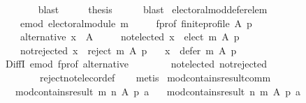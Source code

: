 \begin{isabellebody}
\ \ \ \ \ \ \isamarkupfalse%
\ blast\isanewline
\ \ \isamarkupfalse%
\ \isamarkupfalse%
\ {\isacharquery}{\kern0pt}thesis\isanewline
\ \ \ \ \isamarkupfalse%
\ blast\isanewline
{}\isamarkupfalse%
%
\endisatagproof
{\isafoldproof}%
%
\isadelimproof
\isanewline
%
\endisadelimproof
\isanewline
{}\isamarkupfalse%
\ electoral{\isacharunderscore}{\kern0pt}mod{\isacharunderscore}{\kern0pt}defer{\isacharunderscore}{\kern0pt}elem{\isacharcolon}{\kern0pt}\isanewline
\ \ \isanewline
\ \ \ \ e{\isacharunderscore}{\kern0pt}mod{\isacharcolon}{\kern0pt}\ {\isachardoublequoteopen}electoral{\isacharunderscore}{\kern0pt}module\ m{\isachardoublequoteclose}\ \isanewline
\ \ \ \ f{\isacharunderscore}{\kern0pt}prof{\isacharcolon}{\kern0pt}\ {\isachardoublequoteopen}finite{\isacharunderscore}{\kern0pt}profile\ A\ p{\isachardoublequoteclose}\ \isanewline
\ \ \ \ alternative{\isacharcolon}{\kern0pt}\ {\isachardoublequoteopen}x\ {\isasymin}\ A{\isachardoublequoteclose}\ \isanewline
\ \ \ \ not{\isacharunderscore}{\kern0pt}elected{\isacharcolon}{\kern0pt}\ {\isachardoublequoteopen}x\ {\isasymnotin}\ elect\ m\ A\ p{\isachardoublequoteclose}\ \isanewline
\ \ \ \ not{\isacharunderscore}{\kern0pt}rejected{\isacharcolon}{\kern0pt}\ {\isachardoublequoteopen}x\ {\isasymnotin}\ reject\ m\ A\ p{\isachardoublequoteclose}\isanewline
\ \ \ {\isachardoublequoteopen}x\ {\isasymin}\ defer\ m\ A\ p{\isachardoublequoteclose}\isanewline
%
\isadelimproof
\ \ %
\endisadelimproof
%
\isatagproof
{}\isamarkupfalse%
\ DiffI\ e{\isacharunderscore}{\kern0pt}mod\ f{\isacharunderscore}{\kern0pt}prof\ alternative\isanewline
\ \ \ \ \ \ \ \ not{\isacharunderscore}{\kern0pt}elected\ not{\isacharunderscore}{\kern0pt}rejected\isanewline
\ \ \ \ \ \ \ \ reject{\isacharunderscore}{\kern0pt}not{\isacharunderscore}{\kern0pt}elec{\isacharunderscore}{\kern0pt}or{\isacharunderscore}{\kern0pt}def\isanewline
\ \ \isamarkupfalse%
\ metis%
\endisatagproof
{\isafoldproof}%
%
\isadelimproof
\isanewline
%
\endisadelimproof
\isanewline
{}\isamarkupfalse%
\ mod{\isacharunderscore}{\kern0pt}contains{\isacharunderscore}{\kern0pt}result{\isacharunderscore}{\kern0pt}comm{\isacharcolon}{\kern0pt}\isanewline
\ \ \ {\isachardoublequoteopen}mod{\isacharunderscore}{\kern0pt}contains{\isacharunderscore}{\kern0pt}result\ m\ n\ A\ p\ a{\isachardoublequoteclose}\isanewline
\ \ \ {\isachardoublequoteopen}mod{\isacharunderscore}{\kern0pt}contains{\isacharunderscore}{\kern0pt}result\ n\ m\ A\ p\ a{\isachardoublequoteclose}\isanewline

\end{isabellebody}
